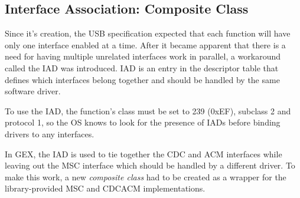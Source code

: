 \subsection{Interface Association: Composite Class}

Since it's creation, the \gls{USB} specification expected that each function will have only one interface enabled at a time. After it became apparent that there is a need for having multiple unrelated interfaces work in parallel, a workaround called the \gls{IAD} was introduced. \gls{IAD} is an entry in the descriptor table that defines which interfaces belong together and should be handled by the same software driver.

To use the \gls{IAD}, the function's class must be set to 239 (0xEF), subclass 2 and protocol 1, so the \gls{OS} knows to look for the presence of \glspl{IAD} before binding drivers to any interfaces.


In GEX, the \gls{IAD} is used to tie together the \gls{CDC} and \gls{ACM} interfaces while leaving out the \gls{MSC} interface which should be handled by a different driver. To make this work, a new \textit{composite class} had to be created as a wrapper for the library-provided \gls{MSC} and \gls{CDCACM} implementations.





